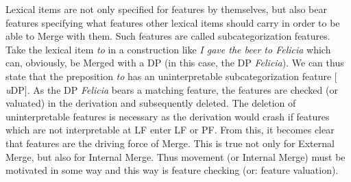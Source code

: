 \noindent Lexical items are not only specified for features by themselves, but also bear features specifying what features other lexical items should carry in order to be able to Merge with them. Such features are called subcategorization features. Take the lexical item \textit{to} in a construction like \textit{I gave the beer to Felicia} which can, obviously, be Merged with a DP (in this case, the DP \textit{Felicia}). We can thus state that the preposition \textit{to} has an uninterpretable subcategorization feature $[$\textit{u}DP$]$. As the DP \textit{Felicia} bears a matching feature, the features are checked (or valuated) in the derivation and subsequently deleted. The deletion of uninterpretable features is necessary as the derivation would crash if features which are not interpretable at LF enter LF or PF. From this, it becomes clear that features are the driving force of Merge. This is true not only for External Merge, but also for Internal Merge. Thus movement (or Internal Merge) must be motivated in some way and this way is feature checking (or: feature valuation). 

